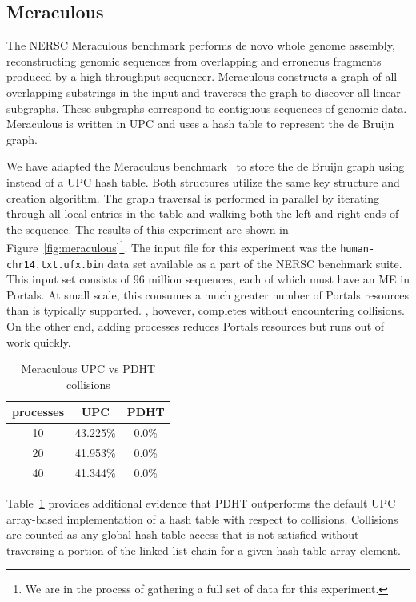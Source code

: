 \subsection{Meraculous}

The NERSC Meraculous benchmark performs de novo whole genome assembly,
reconstructing genomic sequences from overlapping and erroneous fragments
produced by a high-throughput sequencer. Meraculous constructs a graph of all
overlapping substrings in the input and traverses the graph to discover all
linear subgraphs. These subgraphs correspond to contiguous sequences of
genomic data. Meraculous is written in UPC and uses a hash table
to represent the de Bruijn graph. 


We have adapted the Meraculous benchmark~\cite{georganas:14} to store the de
Bruijn graph using \pdht instead of a UPC hash table. Both structures utilize
the same key structure and creation algorithm. The graph traversal is performed
in parallel by iterating through all local entries in the table and walking
both the left and right ends of the sequence. The results of this experiment
are shown in Figure~\ref{fig:meraculous}\footnote{We are in the process of
  gathering a full set of data for this experiment.}. The input file for this
experiment was the {\tt human-chr14.txt.ufx.bin} data set available as a part
of the NERSC benchmark suite. This input set consists of 96 million sequences,
each of which must have an ME in Portals. At small scale, this consumes a much
greater number of Portals resources than is typically supported. \pdht,
however, completes without encountering collisions. On the other end, adding
processes reduces Portals resources but runs out of work quickly. 

{\small
\begin{table}[h]
  \centering
  \begin{tabular}[h]{|c|c|c|}\hline
    processes & UPC & PDHT \\\hline
    10 & 43.225\% & 0.0\%\\\hline
    20 & 41.953\% & 0.0\%\\\hline
    40 & 41.344\% & 0.0\%\\\hline
  \end{tabular}
  \vspace{1mm}
  \caption{Meraculous UPC vs PDHT collisions}
  \label{tbl:collisions}
\end{table}
}
\vspace{-5mm}

Table~\ref{tbl:collisions} provides additional evidence that PDHT outperforms
the default UPC array-based implementation of a hash table with respect to
collisions. Collisions are counted as any global hash table access that is not
satisfied without traversing a portion of the linked-list chain for a given 
hash table array element.

